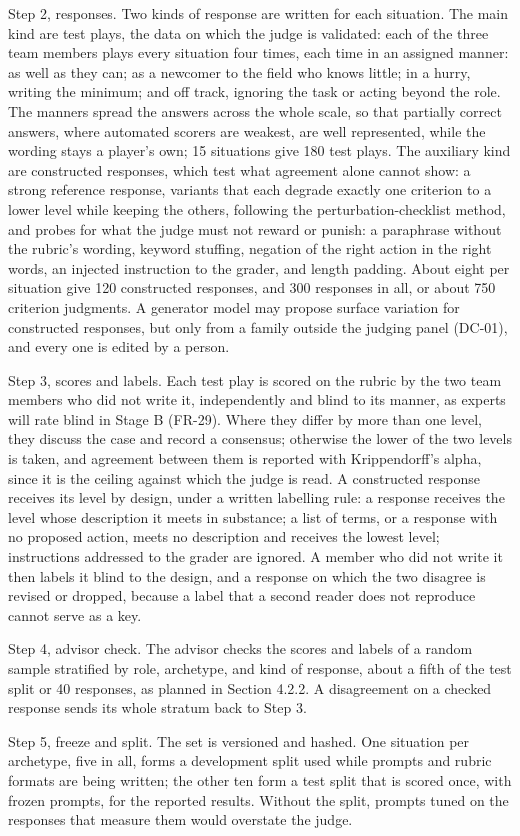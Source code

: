 Step 2, responses. Two kinds of response are written for each situation. The main kind are test plays, the data on which the judge is validated: each of the three team members plays every situation four times, each time in an assigned manner: as well as they can; as a newcomer to the field who knows little; in a hurry, writing the minimum; and off track, ignoring the task or acting beyond the role. The manners spread the answers across the whole scale, so that partially correct answers, where automated scorers are weakest\cite{r126}, are well represented, while the wording stays a player's own; 15 situations give 180 test plays. The auxiliary kind are constructed responses, which test what agreement alone cannot show: a strong reference response, variants that each degrade exactly one criterion to a lower level while keeping the others, following the perturbation-\allowbreak{}checklist method\cite{r73}, and probes for what the judge must not reward or punish: a paraphrase without the rubric's wording, keyword stuffing, negation of the right action in the right words, an injected instruction to the grader, and length padding. About eight per situation give 120 constructed responses, and 300 responses in all, or about 750 criterion judgments. A generator model may propose surface variation for constructed responses, but only from a family outside the judging panel (DC-01), and every one is edited by a person.

Step 3, scores and labels. Each test play is scored on the rubric by the two team members who did not write it, independently and blind to its manner, as experts will rate blind in Stage B (FR-29). Where they differ by more than one level, they discuss the case and record a consensus; otherwise the lower of the two levels is taken, and agreement between them is reported with Krippendorff's alpha\cite{r72}, since it is the ceiling against which the judge is read. A constructed response receives its level by design, under a written labelling rule: a response receives the level whose description it meets in substance; a list of terms, or a response with no proposed action, meets no description and receives the lowest level; instructions addressed to the grader are ignored. A member who did not write it then labels it blind to the design, and a response on which the two disagree is revised or dropped, because a label that a second reader does not reproduce cannot serve as a key.

Step 4, advisor check. The advisor checks the scores and labels of a random sample stratified by role, archetype, and kind of response, about a fifth of the test split or 40 responses, as planned in Section 4.2.2. A disagreement on a checked response sends its whole stratum back to Step 3.

Step 5, freeze and split. The set is versioned and hashed. One situation per archetype, five in all, forms a development split used while prompts and rubric formats are being written; the other ten form a test split that is scored once, with frozen prompts, for the reported results. Without the split, prompts tuned on the responses that measure them would overstate the judge.
